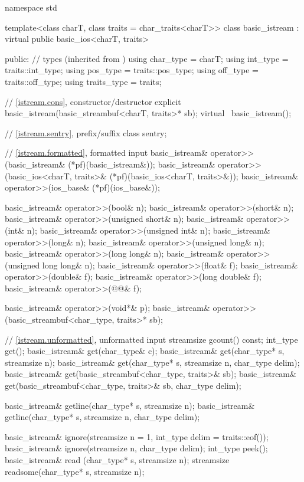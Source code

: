 %
\begin{codeblock}
namespace std {
  template<class charT, class traits = char_traits<charT>>
  class basic_istream : virtual public basic_ios<charT, traits> {
  public:
    // types (inherited from )
    using char_type   = charT;
    using int_type    = traits::int_type;
    using pos_type    = traits::pos_type;
    using off_type    = traits::off_type;
    using traits_type = traits;

    // \ref{istream.cons}, constructor/destructor
    explicit basic_istream(basic_streambuf<charT, traits>* sb);
    virtual ~basic_istream();

    // \ref{istream.sentry}, prefix/suffix
    class sentry;

    // \ref{istream.formatted}, formatted input
    basic_istream& operator>>(basic_istream& (*pf)(basic_istream&));
    basic_istream& operator>>(basic_ios<charT, traits>& (*pf)(basic_ios<charT, traits>&));
    basic_istream& operator>>(ios_base& (*pf)(ios_base&));

    basic_istream& operator>>(bool& n);
    basic_istream& operator>>(short& n);
    basic_istream& operator>>(unsigned short& n);
    basic_istream& operator>>(int& n);
    basic_istream& operator>>(unsigned int& n);
    basic_istream& operator>>(long& n);
    basic_istream& operator>>(unsigned long& n);
    basic_istream& operator>>(long long& n);
    basic_istream& operator>>(unsigned long long& n);
    basic_istream& operator>>(float& f);
    basic_istream& operator>>(double& f);
    basic_istream& operator>>(long double& f);
    basic_istream& operator>>(@@& f);

    basic_istream& operator>>(void*& p);
    basic_istream& operator>>(basic_streambuf<char_type, traits>* sb);

    // \ref{istream.unformatted}, unformatted input
    streamsize gcount() const;
    int_type get();
    basic_istream& get(char_type& c);
    basic_istream& get(char_type* s, streamsize n);
    basic_istream& get(char_type* s, streamsize n, char_type delim);
    basic_istream& get(basic_streambuf<char_type, traits>& sb);
    basic_istream& get(basic_streambuf<char_type, traits>& sb, char_type delim);

    basic_istream& getline(char_type* s, streamsize n);
    basic_istream& getline(char_type* s, streamsize n, char_type delim);

    basic_istream& ignore(streamsize n = 1, int_type delim = traits::eof());
    basic_istream& ignore(streamsize n, char_type delim);
    int_type       peek();
    basic_istream& read    (char_type* s, streamsize n);
    streamsize     readsome(char_type* s, streamsize n);

}}
\end{codeblock}
